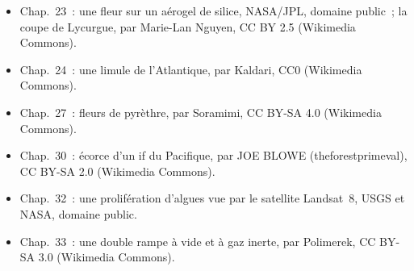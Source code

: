\begin{itemize}
        Wallroth, domaine public (Wikimedia Commons).
  \item Chap.~23~: une fleur sur un aérogel de silice, NASA/JPL, domaine
        public~; la coupe de Lycurgue, par Marie-Lan Nguyen, CC BY 2.5
        (Wikimedia Commons).
  \item Chap.~24~: une limule de l'Atlantique, par Kaldari, CC0 (Wikimedia
        Commons).
  \item Chap.~27~: fleurs de pyrèthre, par Soramimi, CC BY-SA 4.0
        (Wikimedia Commons).
  \item Chap.~30~: écorce d'un if du Pacifique, par JOE BLOWE
        (theforestprimeval), CC BY-SA 2.0 (Wikimedia Commons).
  \item Chap.~32~: une prolifération d'algues vue par le satellite
        Landsat~8, USGS et NASA, domaine public.
  \item Chap.~33~: une double rampe à vide et à gaz inerte, par Polimerek,
        CC BY-SA 3.0 (Wikimedia Commons).
\end{itemize}
\clearpage
